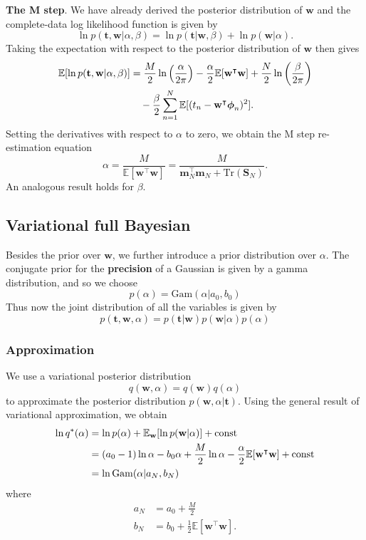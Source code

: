 \documentclass[a4paper]{book}
\newcommand{\up}{\mathrm}
\renewcommand{\bf}{\mathbf}
\newcommand{\bb}{\mathbb}
\newcommand{\bs}{\boldsymbol}
\begin{document}
\textbf{The M step}. We have already derived the posterior distribution of $\bf{w}$ and the complete-data log likelihood function is given by
\begin{equation}
	\ln p(\bf{t,w}|\alpha,\beta) = \ln p(\bf{t|w},\beta) + \ln p(\bf{w}|\alpha).
\end{equation}
Taking the expectation with respect to the posterior distribution of $\bf{w}$ then gives
\begin{align}
	\bb{E}[\ln p(\bf{t,w}|\alpha,\beta)] &= \frac{M}{2} \ln \left( \frac{\alpha}{2\pi} \right) - \frac{\alpha}{2} \bb{E}[\bf{w}^{\intercal} \bf{w}]+\frac{N}{2}\ln \left( \frac{\beta}{2\pi} \right) \notag \\
	&\quad -\frac{\beta}{2}\sum_{n=1}^N \bb{E}[(t_n - \bf{w}^{\intercal} \bs{\phi}_n)^2].
\end{align}
Setting the derivatives with respect to $\alpha$ to zero, we obtain the M step re-estimation equation
\begin{equation}
	\alpha = \frac{M}{\bb{E}[\bf{w}^{\intercal} \bf{w}]} = \frac{M}{\bf{m}_N^{\intercal} \bf{m}_N + \up{Tr}(\bf{S}_N)}.
\end{equation}
An analogous result holds for $\beta$.
\subsection{Variational full Bayesian}
Besides the prior over $\bf{w}$, we further introduce a prior distribution over $\alpha$. The conjugate prior for the \textbf{precision} of a Gaussian is given by a gamma distribution, and so we choose
\begin{equation}
	p(\alpha) = \up{Gam}(\alpha |a_0,b_0)
\end{equation}
Thus now the joint distribution of all the variables is given by
\begin{equation}
	p(\bf{t,w},\alpha) = p(\bf{t|w})p(\bf{w}|\alpha)p(\alpha)
\end{equation}

\subsubsection{Approximation}
We use a variational posterior distribution 
\begin{equation}
	q(\bf{w},\alpha) = q(\bf{w})q(\alpha)
\end{equation}
to approximate the posterior distribution $p(\bf{w},\alpha|\bf{t})$. Using the general result of variational approximation, we obtain
\begin{align}
	\ln q^*(\alpha) &= \ln p(\alpha)+\bb{E}_{\bf{w}}[\ln p(\bf{w}|\alpha)]+\up{const} \notag\\
	&= (a_0-1)\ln \alpha - b_0 \alpha + \frac{M}{2} \ln \alpha - \frac{\alpha}{2}\bb{E}[\bf{w}^{\intercal}\bf{w}]+\up{const} \\
	&= \ln \up{Gam}(\alpha|a_N,b_N)
\end{align}
where
\begin{align}
	a_N &= a_0 + \frac{M}{2} \\
	b_N &= b_0 + \frac{1}{2} \bb{E}[\bf{w}^{\intercal} \bf{w}].
\end{align}
\end{document}
